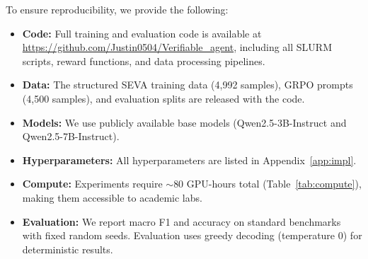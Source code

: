 \documentclass[11pt]{article}
\begin{document}
To ensure reproducibility, we provide the following:

\begin{itemize}[nosep,leftmargin=*]
\item \textbf{Code:} Full training and evaluation code is available at \url{https://github.com/Justin0504/Verifiable_agent}, including all SLURM scripts, reward functions, and data processing pipelines.
\item \textbf{Data:} The structured SEVA training data (4,992 samples), GRPO prompts (4,500 samples), and evaluation splits are released with the code.
\item \textbf{Models:} We use publicly available base models (Qwen2.5-3B-Instruct and Qwen2.5-7B-Instruct).
\item \textbf{Hyperparameters:} All hyperparameters are listed in Appendix~\ref{app:impl}.
\item \textbf{Compute:} Experiments require $\sim$80 GPU-hours total (Table~\ref{tab:compute}), making them accessible to academic labs.
\item \textbf{Evaluation:} We report macro F1 and accuracy on standard benchmarks with fixed random seeds. Evaluation uses greedy decoding (temperature 0) for deterministic results.
\end{itemize}
\end{document}
